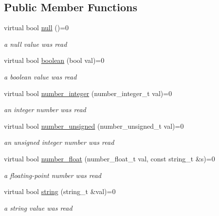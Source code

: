 \subsection*{Public Member Functions}
\begin{DoxyCompactItemize}
\item 
virtual bool \hyperlink{structnlohmann_1_1json__sax_a0ad26edef3f8d530dcec3192bba82df6}{null} ()=0
\begin{DoxyCompactList}\small\item\em a null value was read \end{DoxyCompactList}\item 
virtual bool \hyperlink{structnlohmann_1_1json__sax_a82ed080814fa656191a537284bb0c575}{boolean} (bool val)=0
\begin{DoxyCompactList}\small\item\em a boolean value was read \end{DoxyCompactList}\item 
virtual bool \hyperlink{structnlohmann_1_1json__sax_affa7a78b8e9cc9cc3ac99927143142a5}{number\+\_\+integer} (number\+\_\+integer\+\_\+t val)=0
\begin{DoxyCompactList}\small\item\em an integer number was read \end{DoxyCompactList}\item 
virtual bool \hyperlink{structnlohmann_1_1json__sax_ad9b253083e0509923ba195136f49face}{number\+\_\+unsigned} (number\+\_\+unsigned\+\_\+t val)=0
\begin{DoxyCompactList}\small\item\em an unsigned integer number was read \end{DoxyCompactList}\item 
virtual bool \hyperlink{structnlohmann_1_1json__sax_ae7c31614e8a82164d2d7f8dbf4671b25}{number\+\_\+float} (number\+\_\+float\+\_\+t val, const string\+\_\+t \&s)=0
\begin{DoxyCompactList}\small\item\em a floating-\/point number was read \end{DoxyCompactList}\item 
virtual bool \hyperlink{structnlohmann_1_1json__sax_a07eab82f6c82d606787eee9ad73d2bda}{string} (string\+\_\+t \&val)=0
\begin{DoxyCompactList}\small\item\em a string value was read \end{DoxyCompactList}\item 

\end{DoxyCompactItemize}
